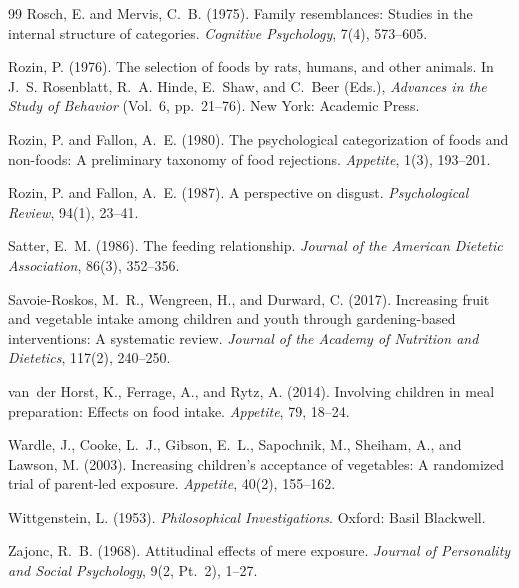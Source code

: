 \documentclass[11pt]{article}
\theoremstyle{remark}
\begin{document}
\begin{thebibliography}{99}
Rosch, E. and Mervis, C.~B. (1975).
\newblock Family resemblances: Studies in the internal structure of categories.
\newblock \emph{Cognitive Psychology}, 7(4), 573--605.

Rozin, P. (1976).
\newblock The selection of foods by rats, humans, and other animals.
\newblock In J.~S. Rosenblatt, R.~A. Hinde, E.~Shaw, and C.~Beer (Eds.), \emph{Advances in the Study of Behavior} (Vol.~6, pp.~21--76). New York: Academic Press.

Rozin, P. and Fallon, A.~E. (1980).
\newblock The psychological categorization of foods and non-foods: A preliminary taxonomy of food rejections.
\newblock \emph{Appetite}, 1(3), 193--201.

Rozin, P. and Fallon, A.~E. (1987).
\newblock A perspective on disgust.
\newblock \emph{Psychological Review}, 94(1), 23--41.

Satter, E.~M. (1986).
\newblock The feeding relationship.
\newblock \emph{Journal of the American Dietetic Association}, 86(3), 352--356.

Savoie-Roskos, M.~R., Wengreen, H., and Durward, C. (2017).
\newblock Increasing fruit and vegetable intake among children and youth through gardening-based interventions: A systematic review.
\newblock \emph{Journal of the Academy of Nutrition and Dietetics}, 117(2), 240--250.

van~der Horst, K., Ferrage, A., and Rytz, A. (2014).
\newblock Involving children in meal preparation: Effects on food intake.
\newblock \emph{Appetite}, 79, 18--24.

Wardle, J., Cooke, L.~J., Gibson, E.~L., Sapochnik, M., Sheiham, A., and Lawson, M. (2003).
\newblock Increasing children's acceptance of vegetables: A randomized trial of parent-led exposure.
\newblock \emph{Appetite}, 40(2), 155--162.

Wittgenstein, L. (1953).
\newblock \emph{Philosophical Investigations}.
\newblock Oxford: Basil Blackwell.

Zajonc, R.~B. (1968).
\newblock Attitudinal effects of mere exposure.
\newblock \emph{Journal of Personality and Social Psychology}, 9(2, Pt.~2), 1--27.

\end{thebibliography}
\end{document}
